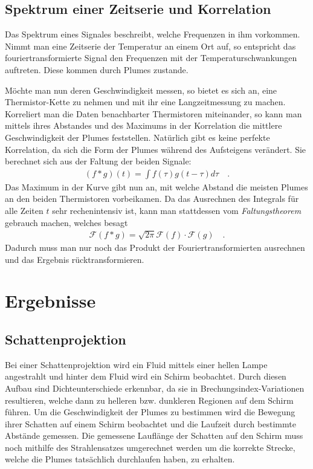 \documentclass[12pt,a4paper,titlepage,headinclude]{scrartcl}
\numberwithin{equation}{subsection}
\begin{document}
\subsection{Spektrum einer Zeitserie und Korrelation}
Das Spektrum eines Signales beschreibt, welche Frequenzen in ihm vorkommen.
Nimmt man eine Zeitserie der Temperatur an einem Ort auf, so entspricht das fouriertransformierte Signal den Frequenzen mit der Temperaturschwankungen auftreten.
Diese kommen durch Plumes zustande.

Möchte man nun deren Geschwindigkeit messen, so bietet es sich an, eine Thermistor-Kette zu nehmen und mit ihr eine Langzeitmessung zu machen.
Korreliert man die Daten benachbarter Thermistoren miteinander, so kann man mittels ihres Abstandes und des Maximums in der Korrelation die mittlere Geschwindigkeit der Plumes feststellen.
Natürlich gibt es keine perfekte Korrelation, da sich die Form der Plumes während des Aufsteigens verändert.
Sie berechnet sich aus der Faltung der beiden Signale:
\begin{align}
	(f*g)(t)=\int f(\tau)g(t-\tau) d\tau\quad.
	\label{eq:faltung}
\end{align}
Das Maximum in der Kurve gibt nun an, mit welche Abstand die meisten Plumes an den beiden Thermistoren vorbeikamen.
Da das Ausrechnen des Integrals für alle Zeiten $t$ sehr rechenintensiv ist, kann man stattdessen vom \textit{Faltungstheorem} gebrauch machen, welches besagt
\begin{align}
	\mathcal F(f*g)=\sqrt{2\pi}\mathcal F(f)\cdot\mathcal F(g)\quad.
	\label{eq:faltungssatz}
\end{align}
Dadurch muss man nur noch das Produkt der Fouriertransformierten ausrechnen und das Ergebnis rücktransformieren.


\newpage
\section{Ergebnisse}
\label{sec:auswertung}

\subsection{Schattenprojektion}
\label{sec:schattenproj}
Bei einer Schattenprojektion wird ein Fluid mittels einer hellen Lampe angestrahlt und hinter dem Fluid wird ein Schirm beobachtet.
Durch diesen Aufbau sind Dichteunterschiede erkennbar, da sie in Brechungsindex-Variationen resultieren, welche dann zu helleren bzw. dunkleren Regionen auf dem Schirm führen.
Um die Geschwindigkeit der Plumes zu bestimmen wird die Bewegung ihrer Schatten auf einem Schirm beobachtet und die Laufzeit durch bestimmte Abstände gemessen.
Die gemessene Lauflänge der Schatten auf den Schirm muss noch mithilfe des Strahlensatzes umgerechnet werden um die korrekte Strecke, welche die Plumes tatsächlich durchlaufen haben, zu erhalten.\\
\end{document}
